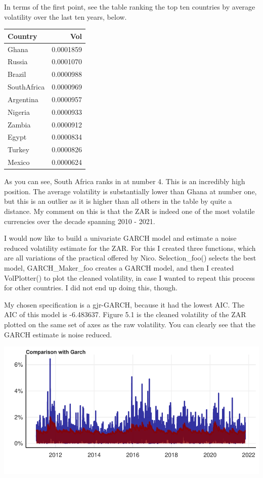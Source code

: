 \documentclass[11pt,preprint, authoryear]{elsarticle}
\let\origfigure\figure
\let\endorigfigure\endfigure
\renewenvironment{figure}[1][2] {
    \expandafter\origfigure\expandafter[H]
} {
    \endorigfigure
}
\numberwithin{equation}{section}
\numberwithin{figure}{section}
\numberwithin{table}{section}
\begin{document}
In terms of the first point, see the table ranking the top ten countries
by average volatility over the last ten years, below.

\begin{longtable}[]{@{}lr@{}}
\toprule\noalign{}
Country & Vol \\
\midrule\noalign{}
\endhead
\bottomrule\noalign{}
\endlastfoot
Ghana & 0.0001859 \\
Russia & 0.0001070 \\
Brazil & 0.0000988 \\
SouthAfrica & 0.0000969 \\
Argentina & 0.0000957 \\
Nigeria & 0.0000933 \\
Zambia & 0.0000912 \\
Egypt & 0.0000834 \\
Turkey & 0.0000826 \\
Mexico & 0.0000624 \\
\end{longtable}

As you can see, South Africa ranks in at number 4. This is an incredibly
high position. The average volatility is substantially lower than Ghana
at number one, but this is an outlier as it is higher than all others in
the table by quite a distance. My comment on this is that the ZAR is
indeed one of the most volatile currencies over the decade spanning 2010
- 2021.

I would now like to build a univariate GARCH model and estimate a noise
reduced volatility estimate for the ZAR. For this I created three
functions, which are all variations of the practical offered by Nico.
Selection\_foo() selects the best model, GARCH\_Maker\_foo creates a
GARCH model, and then I created VolPlotter() to plot the cleaned
volatility, in case I wanted to repeat this process for other countries.
I did not end up doing this, though.

My chosen specification is a gjr-GARCH, because it had the lowest AIC.
The AIC of this model is -6.483637. Figure 5.1 is the cleaned volatility
of the ZAR plotted on the same set of axes as the raw volatility. You
can clearly see that the GARCH estimate is noise reduced.

\begin{figure}[H]

{\centering \includegraphics{Question-5_files/figure-latex/unnamed-chunk-3-1} 

}

\caption{ \label{Figure5.1}}\label{fig:unnamed-chunk-3}
\end{figure}
\end{document}
